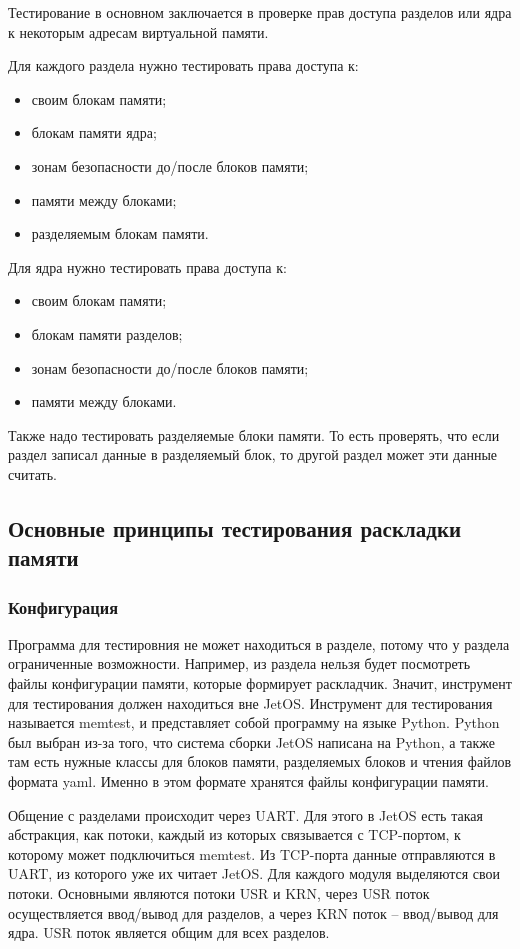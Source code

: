 \documentclass[oneside,senior,etd]{BYUPhys}
\begin{document}
Тестирование в основном заключается в проверке прав доступа разделов или ядра к некоторым адресам
виртуальной памяти.

Для каждого раздела нужно тестировать права доступа к:
\begin{itemize}
  \item своим блокам памяти;
  \item блокам памяти ядра;
  \item зонам безопасности до/после блоков памяти;
  \item памяти между блоками;
  \item разделяемым блокам памяти.
\end{itemize}

Для ядра нужно тестировать права доступа к:
\begin{itemize}
  \item своим блокам памяти;
  \item блокам памяти разделов;
  \item зонам безопасности до/после блоков памяти;
  \item памяти между блоками.
\end{itemize}

Также надо тестировать разделяемые блоки памяти. То есть проверять, что если раздел
записал данные в разделяемый блок, то другой раздел может эти данные считать.

\subsection{Основные принципы тестирования раскладки памяти}

\subsubsection{Конфигурация}

Программа для тестировния не может находиться в разделе, потому что у раздела
ограниченные возможности. Например, из раздела нельзя будет посмотреть файлы
конфигурации памяти, которые формирует раскладчик.
Значит, инструмент для тестирования должен находиться вне JetOS. Инструмент для 
тестирования называется memtest, и представляет собой программу на языке Python. 
Python был выбран из-за того, что система сборки JetOS написана на Python, а также
там есть нужные классы для блоков памяти, разделяемых блоков и чтения файлов формата
yaml. Именно в этом формате хранятся файлы конфигурации памяти.

Общение с разделами происходит через UART. Для этого в JetOS есть такая абстракция,
как потоки, каждый из которых связывается с TCP-портом, к которому может подключиться memtest.
Из TCP-порта данные отправляются в UART, из которого уже их читает JetOS.
Для каждого модуля выделяются свои потоки. Основными являются потоки USR и KRN,
через USR поток осуществляется ввод/вывод для разделов, а через KRN поток -- ввод/вывод
для ядра. USR поток является общим для всех разделов.
\end{document}
